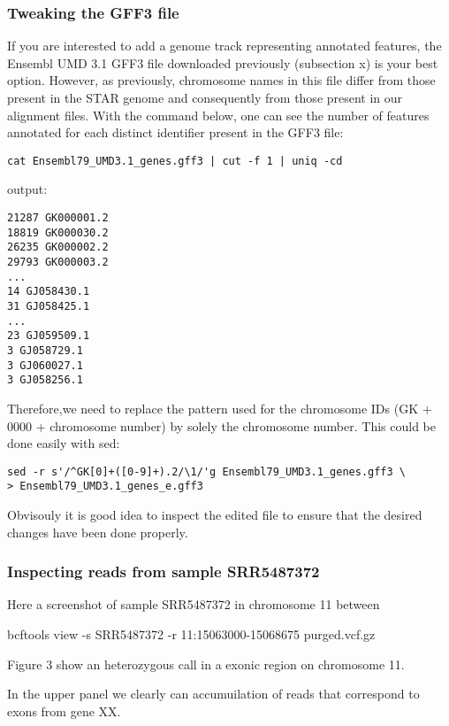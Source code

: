 \subsubsection{Tweaking the GFF3 file}

If you are interested to add a genome track representing annotated features, the Ensembl UMD 3.1 GFF3 file downloaded previously (subsection x) is your best option. However, as previously, chromosome names in this file differ from those present in the STAR genome and consequently from those present in our alignment files. With the command below, one can see the number of features annotated for each distinct identifier present in the GFF3 file:

\begin{verbatim}
cat Ensembl79_UMD3.1_genes.gff3 | cut -f 1 | uniq -cd
\end{verbatim}


\noindent output:
\begin{verbatim}
21287 GK000001.2
18819 GK000030.2
26235 GK000002.2
29793 GK000003.2
...
14 GJ058430.1
31 GJ058425.1
...
23 GJ059509.1
3 GJ058729.1
3 GJ060027.1
3 GJ058256.1
\end{verbatim}

Therefore,we need to replace the pattern used for the chromosome IDs (GK + 0000 + chromosome number) by solely the chromosome number. This could be done easily with sed:

\begin{verbatim}
sed -r s'/^GK[0]+([0-9]+).2/\1/'g Ensembl79_UMD3.1_genes.gff3 \
> Ensembl79_UMD3.1_genes_e.gff3
\end{verbatim}

Obvisouly it is good idea to inspect the edited file to ensure that the desired changes have been done properly.



\subsubsection{Inspecting reads from sample SRR5487372}



Here a screenshot of sample SRR5487372 in chromosome 11 between 





bcftools view -s SRR5487372 -r 11:15063000-15068675  purged.vcf.gz

Figure 3 show an heterozygous call in a exonic region on chromosome 11.

In the upper panel we clearly can accumuilation of reads that correspond to exons from gene XX.







